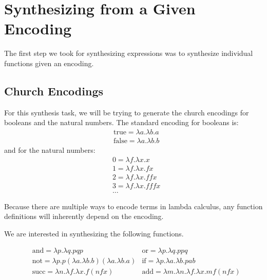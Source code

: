 \section{Synthesizing from a Given Encoding}

The first step we took for synthesizing expressions was to synthesize
  individual functions given an encoding.

\subsection{Church Encodings}
For this synthesis task, we will be trying to generate the church encodings
  for booleans and the natural numbers.
The standard encoding for booleans is:
\begin{align*}
  & \text{true} = \lambda a . \lambda b . a \\
  & \text{false} = \lambda a . \lambda b . b
\end{align*}
and for the natural numbers:
\begin{align*}
  & 0 = \lambda f . \lambda x . x \\
  & 1 = \lambda f . \lambda x . f x \\
  & 2 = \lambda f . \lambda x . f f x \\
  & 3 = \lambda f . \lambda x . f f f x \\
  & \ldots
\end{align*}

Because there are multiple ways to encode terms in lambda calculus, any
  function definitions will inherently depend on the encoding.

We are interested in synthesizing the following functions.

\begin{align*}
  & \text{and} = \lambda p . \lambda q . p q p
  & \text{or} = \lambda p . \lambda q . p p q \\
  & \text{not} = \lambda p . p (\lambda a . \lambda b . b) (\lambda a . \lambda b . a)
  & \text{if}  = \lambda p . \lambda a . \lambda b . p a b \\
  & \text{succ} = \lambda n . \lambda f . \lambda x . f (n f x)
  & \text{add} = \lambda m . \lambda n . \lambda f . \lambda x . m f ( n f x)
\end{align*}

